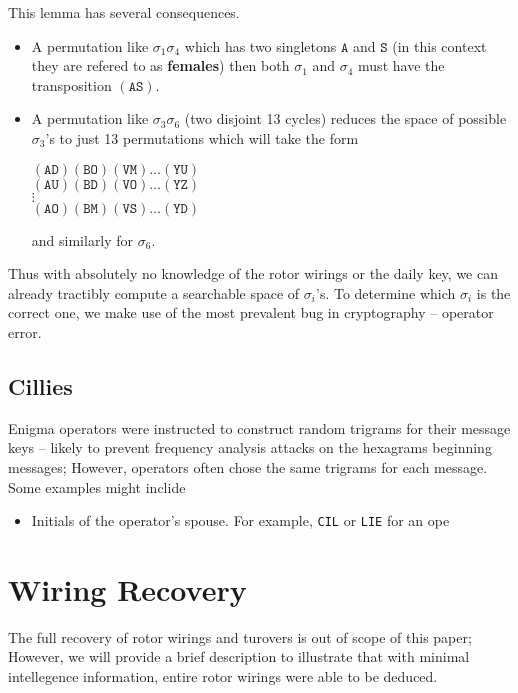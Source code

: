 This lemma has several consequences.
\begin{itemize}
	\item A permutation like $\sigma_1\sigma_4$ which has two singletons $\texttt{A}$ and $\texttt{S}$ (in this context they are refered to as {\bf{females}}) then both $\sigma_1$ and $\sigma_4$ must have the transposition $(\texttt{AS})$.
	\item A permutation like $\sigma_3\sigma_6$ (two disjoint 13 cycles) reduces the space of possible $\sigma_3$'s to just 13 permutations which will take the form
	      \begin{center}
		      $(\texttt{AD})(\texttt{BO})(\texttt{VM})\dots(\texttt{YU})$ \\
		      $(\texttt{AU})(\texttt{BD})(\texttt{VO})\dots(\texttt{YZ})$ \\
		      $\vdots$                                       \\
		      $(\texttt{AO})(\texttt{BM})(\texttt{VS})\dots(\texttt{YD})$
	      \end{center}
	      and similarly for $\sigma_6$.
\end{itemize}
Thus with absolutely no knowledge of the rotor wirings or the daily key, we can already tractibly compute a searchable space of $\sigma_i$'s. To determine which $\sigma_i$ is the correct one, we make use of the most prevalent bug in cryptography -- operator error.

\subsection{Cillies}
Enigma operators were instructed to construct random trigrams for their message keys -- likely to prevent frequency analysis attacks on the hexagrams beginning messages; However, operators often chose the same trigrams for each message. Some examples might inclide
\begin{itemize}
\item Initials of the operator's spouse. For example, \texttt{CIL} or \texttt{LIE} for an ope
\end{itemize}

\section{Wiring Recovery}

The full recovery of rotor wirings and turovers is out of scope of this paper; However, we will provide a brief description to illustrate that with minimal intellegence information, entire rotor wirings were able to be deduced.

